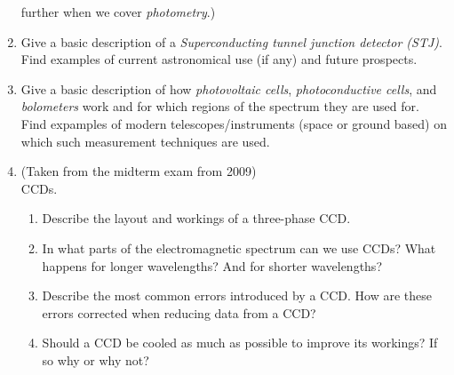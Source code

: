 \begin{enumerate}
  further when we cover {\it photometry}.)
\item Give a basic description of a {\it Superconducting tunnel
    junction detector (STJ)}. Find examples of current
  astronomical use (if any) and future prospects.
\item Give a basic description of how {\it photovoltaic cells}, 
{\it photoconductive cells}, and {\it bolometers} work and for which regions
of the spectrum they are used for. Find expamples of modern telescopes/instruments
(space or ground based) on which such measurement techniques are used.
\item (Taken from the midterm exam from 2009) \\
	CCDs.
	\begin{enumerate}
		\item Describe the layout and workings of a three-phase CCD.
		\item In what parts of the electromagnetic spectrum can we use CCDs? What
			happens for longer wavelengths? And for shorter wavelengths?
		\item Describe the most common errors introduced by a CCD. How are these
			errors corrected when reducing data from a CCD?
		\item Should a CCD be cooled as much as possible to improve its workings? If
			so why or why not?
	\end{enumerate}
\end{enumerate}

